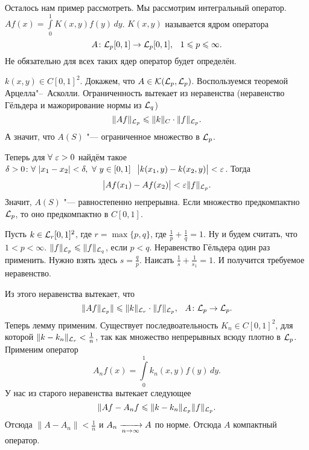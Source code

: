 Осталось нам пример рассмотреть. Мы рассмотрим интегральный оператор. $Af(x) = \int\limits_0^1 K(x,y) f(y)\,dy$. $K(x,y)$ называется ядром оператора
\[
  A\colon \L_p[0,1]\to \L_p[0,1],\pau 1\le p\le \infty.
\]
Не обязательно для всех таких ядер оператор будет определён.
\begin{roItems}
\item $k(x,y)\in C[0,1]^2$. Докажем, что $A\in\mathcal K(\mathcal L_p,\mathcal L_p)$. Воспользуемся теоремой Арцелла"--~Асколли. Ограниченность вытекает из неравенства (неравенство Гёльдера и мажорирование нормы из $\mathcal L_q$)
\[
  \|Af\|_{\mathcal L_p}\leqslant \|k\|_C\cdot \|f\|_{\mathcal L_p}.
\]
А значит, что $A(S)$ "--- ограниченное множество в $\mathcal L_p$.

Теперь для $\forall\ \varepsilon>0$ найдём такое $\delta>0\colon \forall\ |x_1-x_2|<\delta,\ \forall\ y\in[0,1]\pau \big|k(x_1,y) - k(x_2,y)\big|<\e$. Тогда
\[
  \big|Af(x_1) - Af(x_2)\big|<\varepsilon\|f\|_{\mathcal L_p}.
\]
Значит, $A(S)$ "--- равностепенно непрерывна. Если множество предкомпактно $\mathcal L_p$, то оно предкомпактно в $C[0,1]$.
\item Пусть $k\in\mathcal L_r[0,1]^2$, где $r = \max\{p,q\}$, где $\frac1p +\frac1q = 1$. Ну и будем считать, что $1<p<\infty$.
$  \|f\|_{\mathcal L_p}\leqslant \|f\|_{\mathcal L_q}$, если $p<q$. Неравенство Гёльдера один раз применить. Нужно взять здесь $s = \frac qp$. Наисать $\frac1s + \frac1{s_1}=1$. И получится требуемое неравенство.

Из этого неравенства вытекает, что
\[
  \|A f\|_{\L_p}\|\le \|k\|_{\L_r}\cdot\|f\|_{\L_p},\pau A\colon \L_p\to\L_p.
\]
Теперь лемму применим. Существует последвоательность $K_n\in C[0,1]^2$, для которой $\|k-k_n\|_{\mathcal L_r}<\frac1n$, так как множество непрерывных всюду плотно в $\mathcal L_p$. Применим оператор
\[
  A_n f(x) = \int\limits_0^1 k_n(x,y) f(y)\,dy.
\]
У нас из старого неравенства вытекает следующее
\[
  \|A f - A_nf\leqslant \| k-k_n\|_{\mathcal L_p}\|f\|_{\mathcal L_p}.
\]
Отсюда $\|A-A_n\|<\frac1n$ и $A_n\xrightarrow[n\rightarrow\infty]{} A$ по норме. Отсюда $A$ компактный оператор.
\end{roItems}
